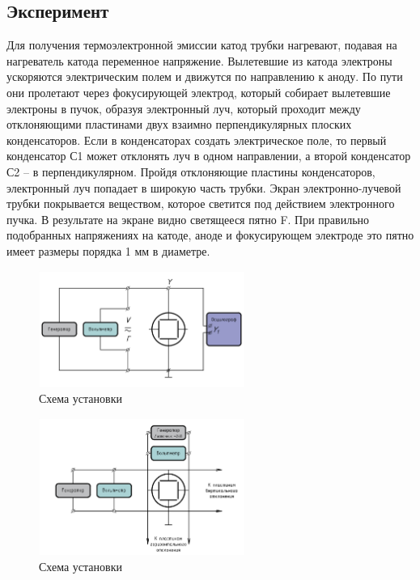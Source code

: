 \subsection{Эксперимент}
Для получения термоэлектронной эмиссии катод трубки нагревают, подавая на нагреватель катода переменное напряжение. Вылетевшие из катода электроны ускоряются электрическим полем и движутся по направлению к аноду. По пути они пролетают через фокусирующей электрод, который собирает вылетевшие электроны в пучок, образуя электронный луч, который проходит между отклоняющими пластинами двух взаимно перпендикулярных плоских конденсаторов. Если в конденсаторах создать электрическое поле, то первый конденсатор С1 может отклонять луч в одном направлении, а второй конденсатор С2 – в перпендикулярном. Пройдя отклоняющие пластины конденсаторов, электронный луч попадает в широкую часть трубки. Экран электронно-лучевой трубки покрывается веществом, которое светится под действием электронного пучка. В результате на экране видно светящееся пятно F. При правильно подобранных напряжениях на катоде, аноде и фокусирующем электроде это пятно имеет размеры порядка 1 мм в диаметре.
\begin{figure}[ht!]
\centering
\includegraphics[width=0.6\textwidth]{1_Осцилограф-Лист1.jpg}
\caption{Схема установки}
\label{fig:sketch}
\end{figure}

\begin{figure}[ht!]
\centering
\includegraphics[width=0.6\textwidth]{2_Осцилограф-Лист1.jpg}
\caption{Схема установки}
\label{fig:sketch}
\end{figure}

